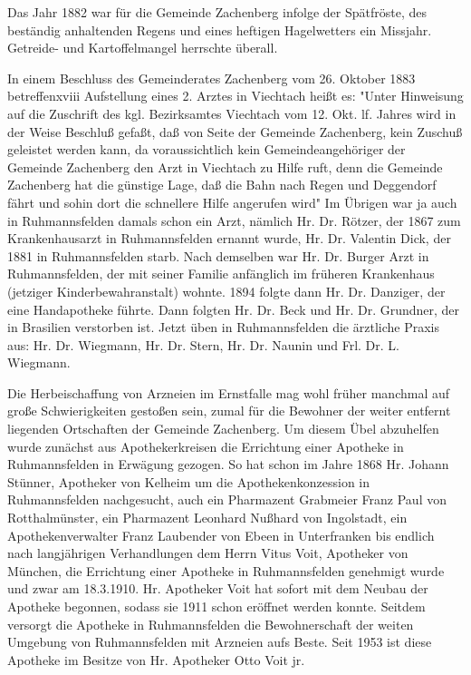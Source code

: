Das Jahr 1882 war für die Gemeinde Zachenberg infolge der Spätfröste, des
beständig anhaltenden Regens und eines heftigen Hagelwetters ein Missjahr.
Getreide- und Kartoffelmangel herrschte überall.

In einem Beschluss des Gemeinderates Zachenberg vom 26. Oktober 1883
betreffenxviii Aufstellung eines 2. Arztes in Viechtach heißt es: "Unter
Hinweisung auf die Zuschrift des kgl. Bezirksamtes Viechtach vom 12. Okt. lf.
Jahres wird in der Weise Beschluß gefaßt, daß von Seite der Gemeinde Zachenberg,
kein Zuschuß geleistet werden kann, da voraussichtlich kein Gemeindeangehöriger
der Gemeinde Zachenberg den Arzt in Viechtach zu Hilfe ruft, denn die Gemeinde
Zachenberg hat die günstige Lage, daß die Bahn nach Regen und Deggendorf fährt
und sohin dort die schnellere Hilfe angerufen wird" Im Übrigen war ja auch in
Ruhmannsfelden damals schon ein Arzt, nämlich Hr. Dr. Rötzer, der 1867 zum
Krankenhausarzt in Ruhmannsfelden ernannt wurde, Hr. Dr. Valentin Dick, der 1881
in Ruhmannsfelden starb. Nach demselben war Hr. Dr. Burger Arzt in
Ruhmannsfelden, der mit seiner Familie anfänglich im früheren Krankenhaus
(jetziger Kinderbewahranstalt) wohnte. 1894 folgte dann Hr. Dr. Danziger, der
eine Handapotheke führte. Dann folgten Hr. Dr. Beck und Hr. Dr. Grundner, der in
Brasilien verstorben ist. Jetzt üben in Ruhmannsfelden die ärztliche Praxis aus:
Hr. Dr. Wiegmann, Hr. Dr. Stern, Hr. Dr. Naunin und Frl. Dr. L. Wiegmann.

Die Herbeischaffung von Arzneien im Ernstfalle mag wohl früher manchmal auf
große Schwierigkeiten gestoßen sein, zumal für die Bewohner der weiter entfernt
liegenden Ortschaften der Gemeinde Zachenberg. Um diesem Übel abzuhelfen wurde
zunächst aus Apothekerkreisen die Errichtung einer Apotheke in Ruhmannsfelden in
Erwägung gezogen. So hat schon im Jahre 1868 Hr. Johann Stünner, Apotheker von
Kelheim um die Apothekenkonzession in Ruhmannsfelden nachgesucht, auch ein
Pharmazent Grabmeier Franz Paul von Rotthalmünster, ein Pharmazent Leonhard
Nußhard von Ingolstadt, ein Apothekenverwalter Franz Laubender von Ebeen in
Unterfranken bis endlich nach langjährigen Verhandlungen dem Herrn Vitus Voit,
Apotheker von München, die Errichtung einer Apotheke in Ruhmannsfelden genehmigt
wurde und zwar am 18.3.1910. Hr. Apotheker Voit hat sofort mit dem Neubau der
Apotheke begonnen, sodass sie 1911 schon eröffnet werden konnte. Seitdem
versorgt die Apotheke in Ruhmannsfelden die Bewohnerschaft der weiten Umgebung
von Ruhmannsfelden mit Arzneien aufs Beste. Seit 1953 ist diese Apotheke im
Besitze von Hr. Apotheker Otto Voit jr.

